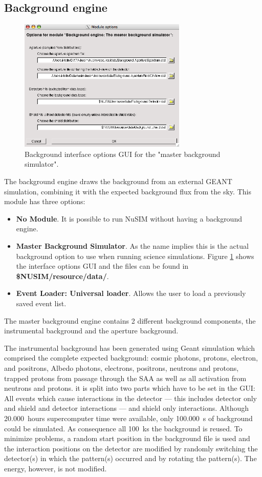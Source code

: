 \subsection{Background engine}
\begin{figure}[tb]
\begin{center}
\includegraphics[width=8cm]{images/backgroundgui.png}  
\caption{Background interface options GUI for the "master background simulator".}
\label{bkggui} 
\end{center}
\end{figure}
The background engine draws the background from an external GEANT simulation, combining it with the expected background flux from the sky. This module has three options:
\begin{itemize}
\item \textbf{No Module}. It is possible to run NuSIM without having a background engine.
\item \textbf{Master Background Simulator}. As the name implies this is the actual background option to use when running science simulations. Figure \ref{bkggui} shows the interface options GUI and the files can be found in \textbf{\${NUSIM}/resource/data/}.
\item \textbf{Event Loader: Universal loader}. Allows the user to load a previously saved event list.
\end{itemize}

The master background engine contains 2 different background components, the instrumental background and the aperture background.

The instrumental background has been generated using Geant simulation which comprised the complete expected background: cosmic photons, protons, electron, and positrons, Albedo photons, electrons, positrons, neutrons and protons, trapped protons from passage through the SAA as well as all activation from neutrons and protons. it is split into two parts which have to be set in the GUI: All events which cause interactions in the detector --- this includes detector only and shield and detector interactions --- and shield only interactions.
Although 20.000~hours supercomputer time were available, only 100.000~s of background could be simulated. As consequence all 100~ks the background is reused.
To minimize problems, a random start position in the background file is used and the interaction positions on the detector are modified by randomly switching the detector(s) in which the pattern(s) occurred and by rotating the pattern(s).
The energy, however, is not modified.

